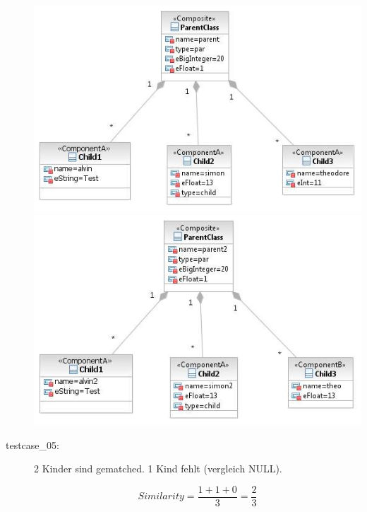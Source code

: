 \documentclass[a4paper]{article}
\begin{document}
\begin{description}
	\includegraphics[scale=0.5]{CompareChildrenMatchedOrSimilarTestScreens/Testcase03model1.jpeg}
	\includegraphics[scale=0.5]{CompareChildrenMatchedOrSimilarTestScreens/Testcase03model2.jpeg}

  \item[testcase\_05:]  2 Kinder sind gematched. 1 Kind fehlt (vergleich NULL).
    
   \begin{equation*}
   Similarity = \frac{1+1+0}{3}=\frac{2}{3}
   \end{equation*}
    

\end{description}
\end{document}
